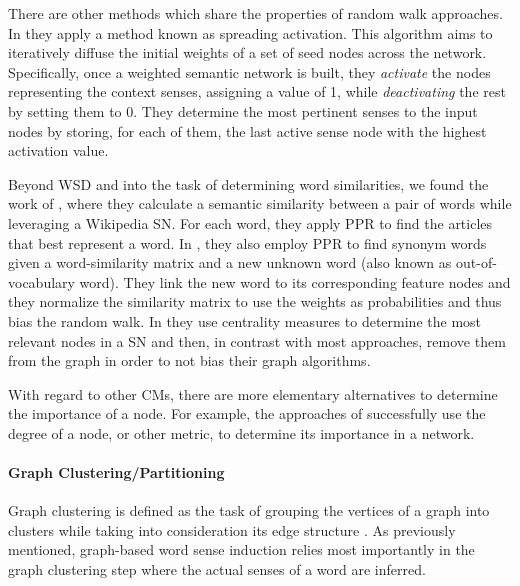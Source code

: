 There are other methods which share the properties of random walk approaches. In  \cite{2007.Tsatsaronis.WSDwithSpreading,2013.Kivimaki.AGraph-BasedApproach} they apply a method known as spreading activation. This algorithm aims to iteratively diffuse the initial weights of a set of seed nodes across the network. Specifically, once a weighted semantic network is built, they \textit{activate}  the nodes representing the context senses, assigning a value of 1, while \textit{deactivating} the rest by setting them to 0. They determine the most pertinent senses to the input nodes by storing, for each of them, the last active sense node with the highest activation value. 

Beyond WSD and into the task of determining word similarities, we found the work of \cite{2009.Yeh.Wikiwalk}, where they calculate a semantic similarity between a pair of words while leveraging a Wikipedia SN. For each word, they  apply PPR to find the articles that best represent a word. 
In \cite{2013.Saluja.Graph-BasedUnsupervisedLearning}, they also employ PPR to find synonym words given a word-similarity matrix and a new unknown word (also known as out-of-vocabulary word). They link the new word to its corresponding feature nodes and they normalize the similarity matrix to use the weights as probabilities and thus bias the random walk. In \cite{2013.Kivimaki.AGraph-BasedApproach} they use centrality measures to determine the most relevant nodes in a SN and then, in contrast with most approaches, remove them from the graph in order to not bias their graph algorithms.
%

With regard to other CMs, there are  more elementary alternatives to determine the importance of a node. For example, the approaches of  \cite{2004.Veronis,2007.Klapaftis.UoY,2011.Haishan.AHypergraphbased,2013.Bronselaer.TextAnalysisWithGraphs,2014.Moro.Navigli.EntityLinking_WSD} successfully use the degree of a node, or other metric, to determine its importance in a network.

\paragraph{Graph Clustering/Partitioning} \label{par:partitioning_clustering} 

Graph clustering is defined as the task of grouping the vertices of a graph into clusters while taking into consideration its edge structure \cite{Schaeffer2007}. As previously mentioned, graph-based word sense induction relies most importantly in the graph clustering step where the actual senses of a word are inferred. 

